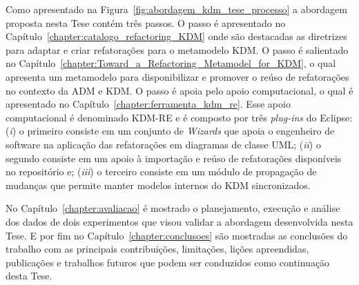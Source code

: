 Como apresentado na Figura~\ref{fig:abordagem_kdm_tese_processo} a abordagem proposta nesta Tese contém três passos. O passo  é apresentado no Capítulo~\ref{chapter:catalogo_refactoring_KDM} onde são destacadas as diretrizes para adaptar e criar refatorações para o metamodelo KDM. O passo  é salientado no Capítulo~\ref{chapter:Toward_a_Refactoring_Metamodel_for_KDM}, o qual apresenta um metamodelo para disponibilizar e promover o reúso de refatorações no contexto da ADM e KDM. %
%
O passo  é apoia pelo apoio computacional, o qual é apresentado no Capítulo~\ref{chapter:ferramenta_kdm_re}. Esse apoio computacional é denominado KDM-RE e é composto por três \textit{plug-ins} do Eclipse: (\textit{i}) o primeiro consiste em um conjunto de \textit{Wizards} que apoia o engenheiro de software na aplicação das refatorações em diagramas de classe UML; (\textit{ii}) o segundo consiste em um apoio à importação e reúso de refatorações disponíveis no repositório e; (\textit{iii}) o terceiro consiste em um módulo de propagação de mudanças que permite manter modelos internos do KDM sincronizados.

No Capítulo~\ref{chapter:avaliacao} é mostrado o planejamento, execução e análise dos dados de dois experimentos  que visou validar a abordagem desenvolvida nesta Tese.  E por fim no Capítulo~\ref{chapter:conclusoes} são mostradas as conclusões do trabalho com as principais contribuições, limitações, lições apreendidas, publicações e trabalhos futuros que podem ser conduzidos como continuação desta Tese.




